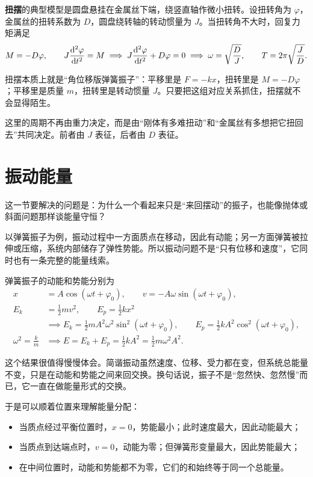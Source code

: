 \documentclass[lang=cn,11pt]{elegantbook}
\newcommand{\bridge}[1]{\begin{note}#1\end{note}}
\begin{document}
\textbf{扭摆}的典型模型是圆盘悬挂在金属丝下端，绕竖直轴作微小扭转。设扭转角为 \(\varphi\)，金属丝的扭转系数为 \(D\)，圆盘绕转轴的转动惯量为 \(J\)。当扭转角不大时，回复力矩满足
\[
M=-D\varphi,\qquad
J\dv[2]{\varphi}{t}=M
\implies
J\dv[2]{\varphi}{t}+D\varphi=0
\implies
\omega=\sqrt{\frac{D}{J}},\qquad
T=2\pi\sqrt{\frac{J}{D}}.
\]

\bridge{扭摆本质上就是“角位移版弹簧振子”：平移里是 \(F=-kx\)，扭转里是 \(M=-D\varphi\)；平移里是质量 \(m\)，扭转里是转动惯量 \(J\)。只要把这组对应关系抓住，扭摆就不会显得陌生。}

\begin{note}
这里的周期不再由重力决定，而是由“刚体有多难扭动”和“金属丝有多想把它扭回去”共同决定。前者由 \(J\) 表征，后者由 \(D\) 表征。
\end{note}

\section{振动能量}

这一节要解决的问题是：为什么一个看起来只是“来回摆动”的振子，也能像抛体或斜面问题那样谈能量守恒？

以弹簧振子为例，振动过程中一方面质点在移动，因此有动能；另一方面弹簧被拉伸或压缩，系统内部储存了弹性势能。所以振动问题不是“只有位移和速度”，它同时也有一条完整的能量线索。

弹簧振子的动能和势能分别为
\[
\begin{aligned}
x&=A\cos(\omega t+\varphi_0),\qquad
v=-A\omega\sin(\omega t+\varphi_0),\\
E_k&=\frac{1}{2}mv^2,\qquad E_p=\frac{1}{2}kx^2\\
&\implies
E_k=\frac{1}{2}mA^2\omega^2\sin^2(\omega t+\varphi_0),\qquad
E_p=\frac{1}{2}kA^2\cos^2(\omega t+\varphi_0),\\
\omega^2=\frac{k}{m}
&\implies
E=E_k+E_p=\frac{1}{2}kA^2=\frac{1}{2}m\omega^2A^2.
\end{aligned}
\]

\bridge{这个结果很值得慢慢体会。简谐振动虽然速度、位移、受力都在变，但系统总能量不变，只是在动能和势能之间来回交换。换句话说，振子不是“忽然快、忽然慢”而已，它一直在做能量形式的交换。}

于是可以顺着位置来理解能量分配：
\begin{itemize}
  \item 当质点经过平衡位置时，\(x=0\)，势能最小；此时速度最大，因此动能最大；
  \item 当质点到达端点时，\(v=0\)，动能为零；但弹簧形变量最大，因此势能最大；
  \item 在中间位置时，动能和势能都不为零，它们的和始终等于同一个总能量。
\end{itemize}
\end{document}
